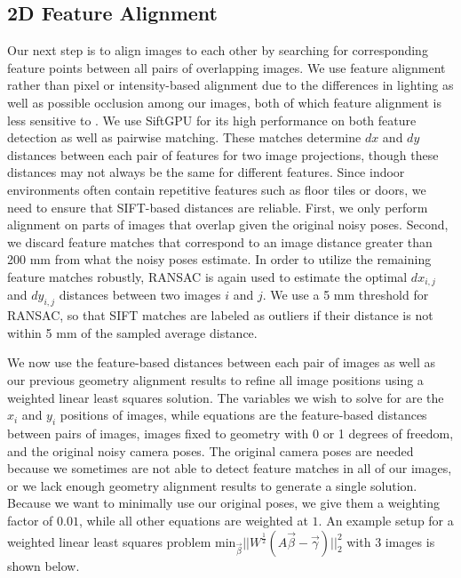 \documentclass[]{spie}  %
\begin{document}
\subsection{2D Feature Alignment}
\label{sec:robustSIFTFeatureMatching}
Our next step is to align images to each other by searching for
corresponding feature points between all pairs of overlapping
images. We use feature alignment rather than pixel or intensity-based
alignment due to the differences in lighting as well as possible
occlusion among our images, both of which feature alignment is less
sensitive to \cite{lowe1999object, mikolajczyk2005performance,
  szeliski2006image}.  We use SiftGPU \cite{siftgpu} for its high
performance on both feature detection as well as pairwise
matching. These matches determine $dx$ and $dy$ distances between each
pair of features for two image projections, though these distances may
not always be the same for different features. Since indoor
environments often contain repetitive features such as floor tiles or
doors, we need to ensure that SIFT-based distances are
reliable. First, we only perform alignment on parts of images that
overlap given the original noisy poses. Second, we discard feature
matches that correspond to an image distance greater than 200 mm from
what the noisy poses estimate. In order to utilize the remaining
feature matches robustly, RANSAC \cite{fischler1981random} is again
used to estimate the optimal $dx_{i,j}$ and $dy_{i,j}$ distances
between two images $i$ and $j$. We use a 5 mm threshold for RANSAC, so
that SIFT matches are labeled as outliers if their distance is not
within 5 mm of the sampled average distance.


We now use the feature-based distances between each pair of images as
well as our previous geometry alignment results to refine all image
positions using a weighted linear least squares solution. The
variables we wish to solve for are the $x_i$ and $y_i$ positions of
images, while equations are the feature-based distances between pairs
of images, images fixed to geometry with 0 or 1 degrees of freedom,
and the original noisy camera poses. The original camera poses are
needed because we sometimes are not able to detect feature matches in
all of our images, or we lack enough geometry alignment results to
generate a single solution. Because we want to minimally use our
original poses, we give them a weighting factor of $0.01$, while all
other equations are weighted at $1$. An example setup for a weighted
linear least squares problem $\textrm{min}_{\vec{\beta}}
||W^\frac{1}{2}(A \vec{\beta} - \vec{\gamma})||_2^2 $ with 3 images is
shown below.
\end{document}
